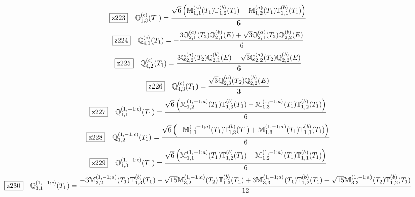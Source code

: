 \documentclass[fleqn,10pt,landscape]{jsarticle}
\begin{document}
\begin{dmath*}
\hspace*{3mm}\fbox{z223}\quad \mathbb{Q}_{1,3}^{(c)}(T_{1})=\frac{\sqrt{6} \left(\mathbb{M}_{1,1}^{(a)}(T_{1}) \mathbb{T}_{1,2}^{(b)}(T_{1}) - \mathbb{M}_{1,2}^{(a)}(T_{1}) \mathbb{T}_{1,1}^{(b)}(T_{1})\right)}{6}
\end{dmath*}
\begin{dmath*}
\hspace*{3mm}\fbox{z224}\quad \mathbb{Q}_{4,1}^{(c)}(T_{1})=- \frac{3 \mathbb{Q}_{2,1}^{(a)}(T_{2}) \mathbb{Q}_{2,1}^{(b)}(E) + \sqrt{3} \mathbb{Q}_{2,1}^{(a)}(T_{2}) \mathbb{Q}_{2,2}^{(b)}(E)}{6}
\end{dmath*}
\begin{dmath*}
\hspace*{3mm}\fbox{z225}\quad \mathbb{Q}_{4,2}^{(c)}(T_{1})=\frac{3 \mathbb{Q}_{2,2}^{(a)}(T_{2}) \mathbb{Q}_{2,1}^{(b)}(E) - \sqrt{3} \mathbb{Q}_{2,2}^{(a)}(T_{2}) \mathbb{Q}_{2,2}^{(b)}(E)}{6}
\end{dmath*}
\begin{dmath*}
\hspace*{3mm}\fbox{z226}\quad \mathbb{Q}_{4,3}^{(c)}(T_{1})=\frac{\sqrt{3} \mathbb{Q}_{2,3}^{(a)}(T_{2}) \mathbb{Q}_{2,2}^{(b)}(E)}{3}
\end{dmath*}
\begin{dmath*}
\hspace*{3mm}\fbox{z227}\quad \mathbb{Q}_{1,1}^{(1,-1;c)}(T_{1})=\frac{\sqrt{6} \left(\mathbb{M}_{1,2}^{(1,-1;a)}(T_{1}) \mathbb{T}_{1,3}^{(b)}(T_{1}) - \mathbb{M}_{1,3}^{(1,-1;a)}(T_{1}) \mathbb{T}_{1,2}^{(b)}(T_{1})\right)}{6}
\end{dmath*}
\begin{dmath*}
\hspace*{3mm}\fbox{z228}\quad \mathbb{Q}_{1,2}^{(1,-1;c)}(T_{1})=\frac{\sqrt{6} \left(- \mathbb{M}_{1,1}^{(1,-1;a)}(T_{1}) \mathbb{T}_{1,3}^{(b)}(T_{1}) + \mathbb{M}_{1,3}^{(1,-1;a)}(T_{1}) \mathbb{T}_{1,1}^{(b)}(T_{1})\right)}{6}
\end{dmath*}
\begin{dmath*}
\hspace*{3mm}\fbox{z229}\quad \mathbb{Q}_{1,3}^{(1,-1;c)}(T_{1})=\frac{\sqrt{6} \left(\mathbb{M}_{1,1}^{(1,-1;a)}(T_{1}) \mathbb{T}_{1,2}^{(b)}(T_{1}) - \mathbb{M}_{1,2}^{(1,-1;a)}(T_{1}) \mathbb{T}_{1,1}^{(b)}(T_{1})\right)}{6}
\end{dmath*}
\begin{dmath*}
\hspace*{3mm}\fbox{z230}\quad \mathbb{Q}_{3,1}^{(1,-1;c)}(T_{1})=\frac{- 3 \mathbb{M}_{3,2}^{(1,-1;a)}(T_{1}) \mathbb{T}_{1,3}^{(b)}(T_{1}) - \sqrt{15} \mathbb{M}_{3,2}^{(1,-1;a)}(T_{2}) \mathbb{T}_{1,3}^{(b)}(T_{1}) + 3 \mathbb{M}_{3,3}^{(1,-1;a)}(T_{1}) \mathbb{T}_{1,2}^{(b)}(T_{1}) - \sqrt{15} \mathbb{M}_{3,3}^{(1,-1;a)}(T_{2}) \mathbb{T}_{1,2}^{(b)}(T_{1})}{12}
\end{dmath*}
\end{document}
